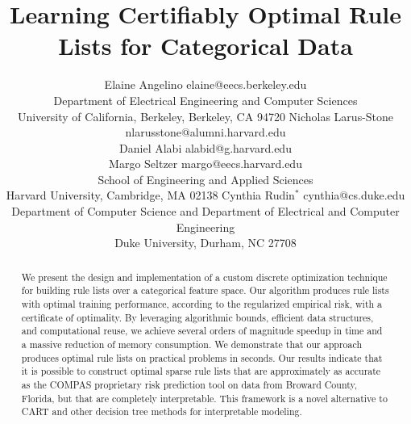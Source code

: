 \documentclass[twoside,11pt]{article}
\begin{document}
\title{Learning Certifiably Optimal Rule Lists for Categorical Data}

\author{\name Elaine Angelino \email elaine@eecs.berkeley.edu \\
        \addr Department of Electrical Engineering and Computer Sciences\\
        University of California, Berkeley,
        Berkeley, CA 94720
        \AND
        \name Nicholas Larus-Stone \email nlarusstone@alumni.harvard.edu \\
        \name Daniel Alabi \email alabid@g.harvard.edu \\
        \name Margo Seltzer \email margo@eecs.harvard.edu \\
        \addr School of Engineering and Applied Sciences\\
        Harvard University,
        Cambridge, MA 02138
        \AND
        \name Cynthia Rudin$^*$ \email cynthia@cs.duke.edu \\
        \addr Department of Computer Science and
        Department of Electrical and Computer Engineering\\
        Duke University,
        Durham, NC 27708}


\maketitle

\begin{abstract}%
We present the design and implementation of a custom discrete optimization
technique for building rule lists over a categorical feature space.
%
Our algorithm produces rule lists with optimal training performance,
according to the regularized empirical risk, with a certificate of optimality.
%
By leveraging algorithmic bounds, efficient data structures,
and computational reuse, we achieve several orders of magnitude speedup in time
and a massive reduction of memory consumption.
%
We demonstrate that our approach produces optimal rule lists on practical
problems in seconds.
%
Our results indicate that it is possible to construct optimal sparse rule lists that are
approximately as accurate as the COMPAS proprietary risk prediction tool on data from
Broward County, Florida, but that are completely interpretable.
%
This framework is a novel alternative to CART and other decision tree methods for interpretable modeling.
\end{abstract}
\end{document}
